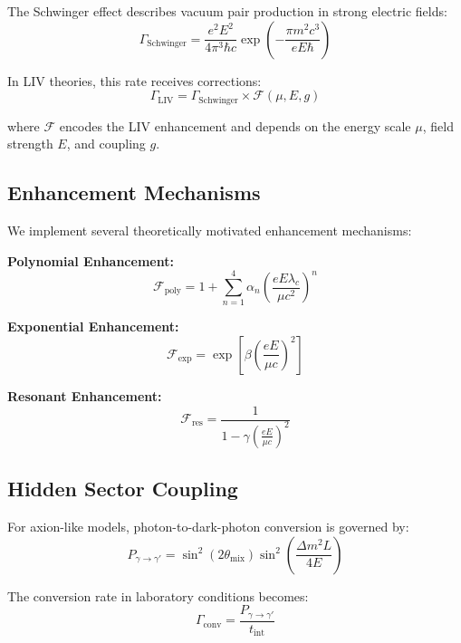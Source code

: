 \documentclass[12pt]{article}
\begin{document}
The Schwinger effect describes vacuum pair production in strong electric fields:
\begin{equation}
\Gamma_{\text{Schwinger}} = \frac{e^2 E^2}{4\pi^3 \hbar c} \exp\left(-\frac{\pi m^2 c^3}{eE\hbar}\right)
\end{equation}

In LIV theories, this rate receives corrections:
\begin{equation}
\Gamma_{\text{LIV}} = \Gamma_{\text{Schwinger}} \times \mathcal{F}(\mu, E, g)
\end{equation}

where $\mathcal{F}$ encodes the LIV enhancement and depends on the energy scale $\mu$, field strength $E$, and coupling $g$.

\subsection{Enhancement Mechanisms}

We implement several theoretically motivated enhancement mechanisms:

\textbf{Polynomial Enhancement:}
\begin{equation}
\mathcal{F}_{\text{poly}} = 1 + \sum_{n=1}^4 \alpha_n \left(\frac{eE\lambda_c}{\mu c^2}\right)^n
\end{equation}

\textbf{Exponential Enhancement:}
\begin{equation}
\mathcal{F}_{\text{exp}} = \exp\left[\beta \left(\frac{eE}{\mu c}\right)^2\right]
\end{equation}

\textbf{Resonant Enhancement:}
\begin{equation}
\mathcal{F}_{\text{res}} = \frac{1}{1 - \gamma \left(\frac{eE}{\mu c}\right)^2}
\end{equation}

\subsection{Hidden Sector Coupling}

For axion-like models, photon-to-dark-photon conversion is governed by:
\begin{equation}
P_{\gamma \to \gamma'} = \sin^2(2\theta_{\text{mix}}) \sin^2\left(\frac{\Delta m^2 L}{4E}\right)
\end{equation}

The conversion rate in laboratory conditions becomes:
\begin{equation}
\Gamma_{\text{conv}} = \frac{P_{\gamma \to \gamma'}}{t_{\text{int}}}
\end{equation}
\end{document}
